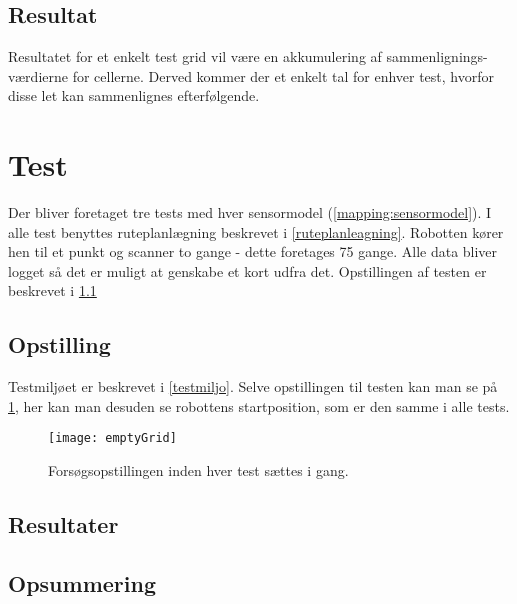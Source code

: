 \subsection{Resultat}
Resultatet for et enkelt test grid vil være en akkumulering af sammenlignings-værdierne for cellerne.
Derved kommer der et enkelt tal for enhver test, hvorfor disse let kan sammenlignes efterfølgende.

\section{Test}\label{evaluering:test_beskrivelse}
Der bliver foretaget tre tests med hver sensormodel (\cref{mapping:sensormodel}).
I alle test benyttes ruteplanlægning beskrevet i \cref{ruteplanleagning}.
Robotten kører hen til et punkt og scanner to gange - dette foretages 75 gange.
Alle data bliver logget så det er muligt at genskabe et kort udfra det.
Opstillingen af testen er beskrevet i \cref{evaluering:opstilling}

\subsection{Opstilling}\label{evaluering:opstilling}
Testmiljøet er beskrevet i \cref{testmiljo}.
Selve opstillingen til testen kan man se på \cref{evaluering:emptyGrid}, her kan man desuden se robottens startposition, som er den samme i alle tests.

\begin{figure}[h]
\texttt{[image: emptyGrid]}
\caption{Forsøgsopstillingen inden hver test sættes i gang.}
\label{evaluering:emptyGrid}
\end{figure}
\subsection{Resultater}

\subsection{Opsummering}